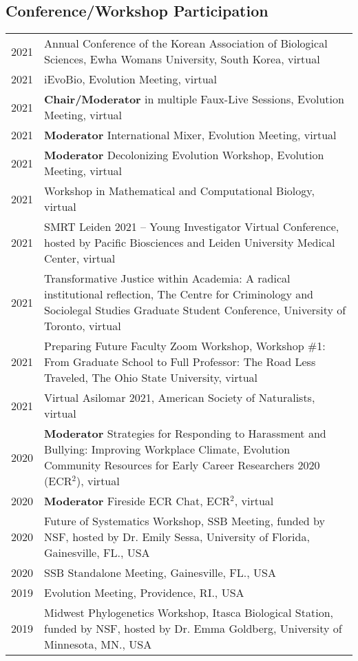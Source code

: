 \documentclass[11pt]{article}
\begin{document}
\subsection*{Conference/Workshop Participation}
\begin{longtable}{p{}  p{}}
2021 & Annual Conference of the Korean Association of Biological Sciences, Ewha Womans University, South Korea, virtual\\

2021 & iEvoBio, Evolution Meeting, virtual\\
2021 & \textbf{Chair/Moderator} in multiple Faux-Live Sessions, Evolution Meeting, virtual\\
2021& \textbf{Moderator} International Mixer, Evolution Meeting, virtual\\
2021& \textbf{Moderator} Decolonizing Evolution Workshop, Evolution Meeting, virtual\\
2021 & Workshop in Mathematical and Computational Biology, virtual\\
2021 & SMRT Leiden 2021 – Young Investigator Virtual Conference, hosted by Pacific Biosciences and Leiden University Medical Center, virtual\\
2021 & Transformative Justice within Academia: A radical institutional reflection, The Centre for Criminology and Sociolegal Studies Graduate Student Conference, University of Toronto, virtual\\
2021 & Preparing Future Faculty Zoom Workshop, Workshop \#1: From Graduate School to Full Professor: The Road Less Traveled, The Ohio State University, virtual\\
2021 & Virtual Asilomar 2021, American Society of Naturalists, virtual\\
2020 &	\textbf{Moderator} Strategies for Responding to Harassment and Bullying: Improving Workplace Climate, Evolution Community Resources for Early Career Researchers 2020 (ECR$^2$), virtual\\
2020 &	\textbf{Moderator} Fireside ECR Chat, ECR$^2$, virtual\\
2020 & Future of Systematics Workshop, SSB Meeting, funded by NSF, hosted by Dr. Emily Sessa, University of Florida, Gainesville, FL., USA\\
2020 & SSB Standalone Meeting, Gainesville, FL., USA\\
2019 & Evolution Meeting, Providence, RI., USA\\
2019 & Midwest Phylogenetics Workshop, Itasca Biological Station, funded by NSF, hosted by Dr. Emma Goldberg, University of Minnesota, MN., USA\\

\end{longtable}
\end{document}
